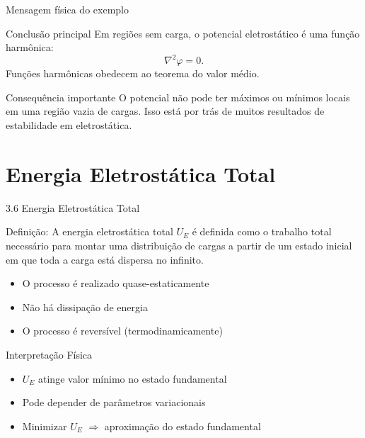 \documentclass[aspectratio=169,11pt]{beamer}
\begin{document}
\begin{frame}{Mensagem física do exemplo}

\begin{alertblock}{Conclusão principal}
Em regiões sem carga, o potencial eletrostático é uma função harmônica:
\[
\nabla^2\varphi = 0.
\]
Funções harmônicas obedecem ao teorema do valor médio.
\end{alertblock}

\begin{mybox}{Consequência importante}
O potencial não pode ter máximos ou mínimos locais em uma região vazia de cargas.
Isso está por trás de muitos resultados de estabilidade em eletrostática.
\end{mybox}

\end{frame}




\section{Energia Eletrostática Total}

\begin{frame}{3.6 Energia Eletrostática Total}

\begin{mybox}{Definição: }
A energia eletrostática total $U_E$ é definida como o trabalho total necessário para montar uma distribuição de cargas a partir de um estado inicial em que toda a carga está dispersa no infinito.
\end{mybox}

\begin{itemize}
\item O processo é realizado quase-estaticamente
\item Não há dissipação de energia
\item O processo é reversível (termodinamicamente)
\end{itemize}

\end{frame}

\begin{frame}{Interpretação Física}

\begin{itemize}
\item $U_E$ atinge valor mínimo no estado fundamental
\item Pode depender de parâmetros variacionais
\item Minimizar $U_E$ $\Rightarrow$ aproximação do estado fundamental
\end{itemize}

\end{frame}
\end{document}
